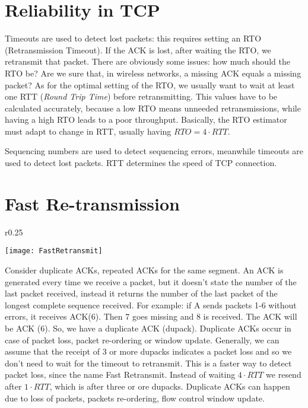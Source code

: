 \section{Reliability in TCP}
Timeouts are used to detect lost packets: this 
requires setting an RTO (Retransmission Timeout). If the ACK is lost, after 
waiting the RTO, we retransmit that packet. There are obviously some issues: how
much should the RTO be? Are we sure that, in wireless networks, a missing ACK 
equals a missing packet?
As for the optimal setting of the RTO, we usually want to wait at least 
one RTT (\textit{Round Trip Time}) before retransmitting. This values have to be
calculated accurately, because a low RTO means unneeded retransmissions, while 
having a high RTO leads to a poor throughput. Basically, the RTO estimator must 
adapt to change in RTT, usually having $RTO=4 \cdot RTT$.

Sequencing numbers are used to detect sequencing errors, meanwhile timeouts
are used to detect lost packets.
RTT determines the speed of TCP connection.

\section{Fast Re-transmission}

\begin{wrapfigure}{r}{0.25\textwidth}
  \begin{center}
    \texttt{[image: FastRetransmit]}
  \end{center}
  \caption[Fast Retransmission example]{}
\end{wrapfigure}

Consider duplicate ACKs, repeated ACKs for the same segment. An ACK is generated
every time we receive a packet, but it doesn't
state the number of the last packet received, instead it returns the number of
the last packet of the longest complete sequence received.
For example: if A sends packets 1-6 without errors, it receives ACK(6). 
Then 7 goes missing and 8 is received. The ACK will be ACK (6). So, we have a 
duplicate ACK (dupack).
Duplicate ACKs occur in case of packet loss, packet re-ordering or 
window update. Generally, we can assume that the receipt of 3 or more dupacks 
indicates a packet loss and so we don't need to wait for the timeout to 
retransmit. This is a faster way to detect packet loss, since the name Fast 
Retransmit.
Instead of waiting $4 \cdot RTT$ we resend after $1 \cdot RTT$, which is after
three or ore dupacks.
Duplicate ACKs can happen due to loss of packets, packets re-ordering, flow
control window update.

